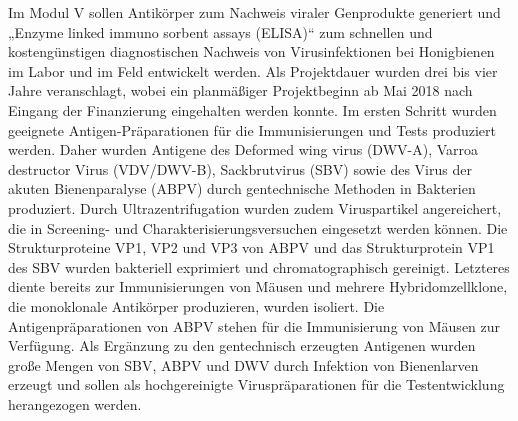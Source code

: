 Im Modul V sollen Antikörper zum Nachweis viraler Genprodukte generiert und „Enzyme linked immuno sorbent assays (ELISA)“ zum schnellen und kostengünstigen diagnostischen Nachweis von Virusinfektionen bei Honigbienen im Labor und im Feld entwickelt werden. Als Projektdauer wurden drei bis vier Jahre veranschlagt, wobei ein planmäßiger Projektbeginn ab Mai 2018 nach Eingang der Finanzierung eingehalten werden konnte. Im ersten Schritt wurden geeignete Antigen-Präparationen für die Immunisierungen und Tests produziert werden. Daher wurden Antigene des Deformed wing virus (DWV-A), Varroa destructor Virus (VDV/DWV-B), Sackbrutvirus (SBV) sowie des Virus der akuten Bienenparalyse (ABPV) durch gentechnische Methoden in Bakterien produziert. Durch Ultrazentrifugation wurden zudem Viruspartikel angereichert, die in Screening- und Charakterisierungsversuchen eingesetzt werden können. Die Strukturproteine VP1, VP2 und VP3 von ABPV und das Strukturprotein VP1 des SBV wurden bakteriell exprimiert und chromatographisch gereinigt. Letzteres diente bereits zur Immunisierungen von Mäusen und mehrere Hybridomzellklone, die monoklonale Antikörper produzieren, wurden isoliert. Die Antigenpräparationen von ABPV stehen für die Immunisierung von Mäusen zur Verfügung. Als Ergänzung zu den gentechnisch erzeugten Antigenen wurden große Mengen von SBV, ABPV und DWV durch Infektion von Bienenlarven erzeugt und sollen als hochgereinigte Viruspräparationen für die Testentwicklung herangezogen werden.